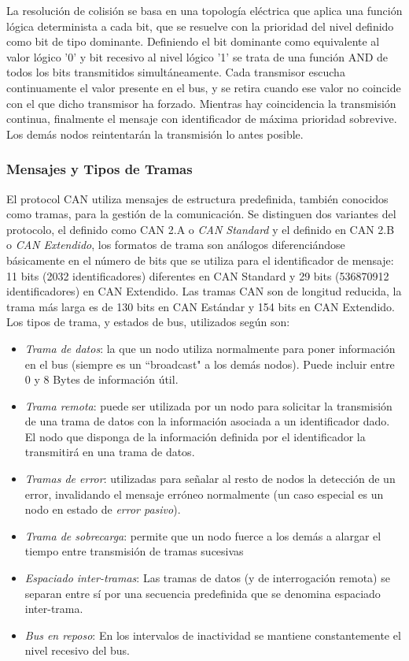 La resolución de colisión se basa en una topología eléctrica que aplica una 
función lógica determinista a cada bit, que se resuelve con la prioridad del 
nivel definido como bit de tipo dominante.  Definiendo el bit dominante como 
equivalente al valor lógico '0' y bit recesivo al  nivel lógico '1' se trata de 
una función AND de todos los bits transmitidos simultáneamente. Cada transmisor 
escucha continuamente el valor presente en el bus, y se retira cuando ese valor 
no coincide con el que dicho transmisor ha forzado. Mientras hay coincidencia 
la transmisión continua, finalmente el mensaje con identificador de máxima 
prioridad sobrevive. Los demás nodos reintentarán la transmisión lo antes 
posible.

\subsubsection{Mensajes y Tipos de Tramas}

El protocol \acrshort{CAN} utiliza mensajes de estructura predefinida, tambi\'en
conocidos como tramas, para la gestión de la comunicación.
Se distinguen dos variantes del protocolo, el definido como CAN 2.A o 
\emph{CAN Standard} y el definido en CAN 2.B o \emph{CAN Extendido}, los 
formatos de trama son análogos diferenciándose básicamente en el número de bits 
que se utiliza para el identificador de mensaje: 11 bits (2032 identificadores) 
diferentes en CAN Standard y 29 bits (536870912 identificadores) en CAN 
Extendido.
Las tramas CAN son de longitud reducida, la trama más larga es de 130 bits en 
CAN Estándar y 154 bits en CAN Extendido.
Los tipos de trama, y estados de bus, utilizados seg\'un 
\cite{KaschelHector2004} son:

\begin{itemize}
    \item \emph{Trama de datos}: la que un nodo utiliza normalmente para poner 
        información en el bus (siempre es un ``broadcast" a los demás nodos). 
        Puede incluir entre 0 y 8 Bytes de información útil.
    \item \emph{Trama remota}: puede ser utilizada por un nodo para solicitar la 
        transmisión de una trama de datos con la información asociada a un 
        identificador dado. El nodo que disponga de la información definida por 
        el identificador la transmitirá en una trama de datos.
    \item \emph{Tramas de error}: utilizadas para señalar al resto de nodos la 
        detección de un error, invalidando el mensaje erróneo normalmente (un 
        caso especial es un nodo en estado de \emph{error pasivo}).
    \item \emph{Trama de sobrecarga}: permite que un nodo fuerce a los demás a 
        alargar el tiempo entre transmisión de tramas sucesivas
    \item \emph{Espaciado inter-tramas}: Las tramas de datos 
        (y de interrogación remota) se separan entre sí por una secuencia 
        predefinida que se denomina espaciado inter-trama.
    \item \emph{Bus en reposo}: En los intervalos de inactividad se mantiene 
        constantemente el nivel recesivo del bus.
\end{itemize}



